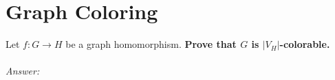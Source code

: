 \documentclass{article}
\begin{document}
  \section{Graph Coloring}
    Let $f:G\to H$ be a graph homomorphism.
    \textbf{Prove that $G$ is $|V_H|$-colorable.}
  \\\\
  \textit{Answer:}
    

    
\end{document}
